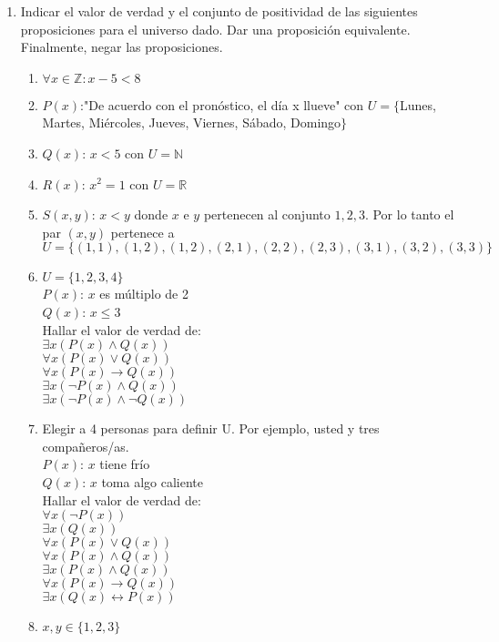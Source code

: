 \documentclass[a4paper]{article}
\newcommand{\exercise}{\item}
\newcommand{\then}{\to}
\newcommand{\eq}{\leftrightarrow}
\begin{document}
\begin{enumerate}
\begin{enumerate} [label=(\alph*)]
	\end{enumerate}
	\exercise Indicar el valor de verdad y el conjunto de positividad de las siguientes proposiciones para el universo dado. Dar una proposición equivalente. Finalmente, negar las proposiciones.
	\begin{enumerate} [label=(\alph*)]
		\item $\forall x \in \mathbb{Z}: x-5 < 8$ 
		\item $P(x)$:"De acuerdo con el pronóstico, el día x llueve" con $U = \{$Lunes, Martes, Miércoles, Jueves, Viernes, Sábado, Domingo$\}$
		\item $Q(x)$: $x < 5$ con $U = \mathbb{N}$
		\item $R(x)$: $x^2 =1$ con $U = \mathbb{R}$
		\item $S(x,y)$: $x < y$ donde $x$ e $y$ pertenecen al conjunto ${1,2,3}$. Por lo tanto el par $(x,y)$ pertenece a $U = \{ (1,1), (1,2), (1,2), (2,1), (2,2), (2,3), (3,1), (3,2), (3,3) \}$
		\item $U = \{1,2,3,4\}$ \\
			$P(x)$: $x$ es múltiplo de 2 \\
			$Q(x)$: $x \leq 3$ \\
			Hallar el valor de verdad de: \\
			$\exists x ( P(x) \land  Q(x) )$ \\ 
			$\forall x ( P(x) \lor  Q(x) )$ \\
			$\forall x ( P(x) \then  Q(x) )$ \\
			$\exists x ( \neg P(x) \land  Q(x) )$ \\
			$\exists x ( \neg P(x) \land  \neg Q(x) )$ 
		\item Elegir a 4 personas para definir U. Por ejemplo, usted y tres compañeros/as. \\
			$P(x)$: $x$ tiene frío \\
			$Q(x)$: $x$ toma algo caliente \\
			Hallar el valor de verdad de: \\
			$\forall x ( \neg P(x) )$  \\
			$\exists x ( Q(x) )$ \\
			$\forall x ( P(x) \lor  Q(x) )$  \\
			$\forall x ( P(x) \land  Q(x) )$ \\
			$\exists x ( P(x) \land  Q(x) )$  \\
			$\forall x ( P(x) \then  Q(x) )$  \\
			$\exists x ( Q(x) \eq P(x) )$  
		\item $x,y \in \{1,2,3\}$ \\

\end{enumerate}
\end{enumerate}
\end{document}
